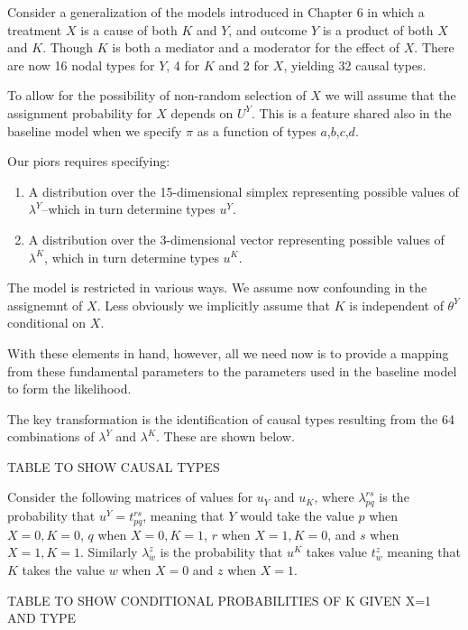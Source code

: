 \documentclass[12pt,]{book}
\providecommand{\tightlist}{%
  \setlength{\itemsep}{0pt}\setlength{\parskip}{0pt}}
\begin{document}
Consider a generalization of the models introduced in Chapter 6 in which a treatment \(X\) is a cause of both \(K\) and \(Y\), and outcome \(Y\) is a product of both \(X\) and \(K\). Though \(K\) is both a mediator and a moderator for the effect of \(X\). There are now 16 nodal types for \(Y\), 4 for \(K\) and 2 for \(X\), yielding 32 causal types.

To allow for the possibility of non-random selection of \(X\) we will assume that the assignment probability for \(X\) depends on \(U^Y\). This is a feature shared also in the baseline model when we specify \(\pi\) as a function of types \(a\),\(b\),\(c\),\(d\).

Our piors requires specifying:

\begin{enumerate}
\def\labelenumi{\arabic{enumi}.}
\tightlist
\item
  A distribution over the 15-dimensional simplex representing possible values of \(\lambda^Y\)--which in turn determine types \(u^Y\).
\item
  A distribution over the 3-dimensional vector representing possible values of \(\lambda^K\), which in turn determine types \(u^K\).
\end{enumerate}

The model is restricted in various ways. We assume now confounding in the assignemnt of \(X\). Less obviously we implicitly assume that \(K\) is independent of \(\theta^Y\) conditional on \(X\).

With these elements in hand, however, all we need now is to provide a mapping from these fundamental parameters to the parameters used in the baseline model to form the likelihood.

The key transformation is the identification of causal types resulting from the 64 combinations of \(\lambda^Y\) and \(\lambda^K\). These are shown below.

TABLE TO SHOW CAUSAL TYPES

Consider the following matrices of values for \(u_Y\) and \(u_K\), where \(\lambda_{pq}^{rs}\) is the probability that \(u^Y = t_{pq}^{rs}\), meaning that \(Y\) would take the value \(p\) when \(X=0, K=0\), \(q\) when \(X=0, K=1\), \(r\) when \(X=1, K=0\), and \(s\) when \(X=1, K=1\). Similarly \(\lambda_{w}^{z}\) is the probability that \(u^K\) takes value \(t_{w}^{z}\) meaning that \(K\) takes the value \(w\) when \(X=0\) and \(z\) when \(X=1\).

TABLE TO SHOW CONDITIONAL PROBABILITIES OF K GIVEN X=1 AND TYPE
\end{document}
